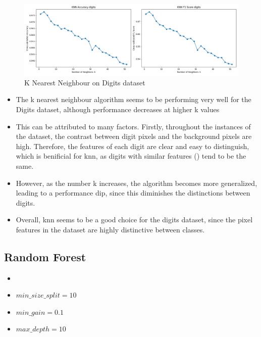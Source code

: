 \documentclass[letterpaper]{article}
\begin{document}
\begin{figure}[H]
	\includegraphics[width=\textwidth]{figures/knn_digits.png}
	\caption{K Nearest Neighbour on Digits dataset}
	\label{fig:knn-digits}
\end{figure}
\begin{itemize}
	\item The k nearest neighbour algorithm seems to be performing very well for the Digits dataset, although performance decreases at higher k values
	\item This can be attributed to many factors. Firstly, throughout the instances of the dataset, the contrast between digit pixels and the background
	      pixels are high. Therefore, the features of each digit are clear and easy to distinguish, which is benificial for knn, as digits with similar features () tend to be the same.
	\item However, as the number k increases, the algorithm becomes more generalized, leading to a performance dip, since this diminishes the distinctions between digits.
	\item Overall, knn seems to be a good choice for the digits dataset, since the pixel features in the dataset are highly distinctive between classes.
\end{itemize}

\subsection*{Random Forest}
\begin{itemize}
	\item {}
	\item $min\_size\_split = 10$
	\item $min\_gain = 0.1$
	\item $max\_depth = 10$
\end{itemize}
\end{document}

